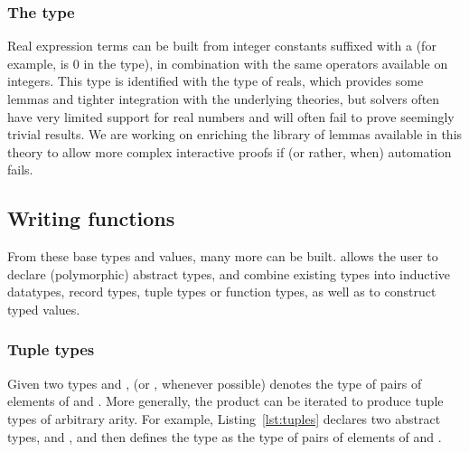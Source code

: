 \subsubsection*{The  type}
Real expression terms can be built from integer constants suffixed with a
 (for example,  is 0 in the  type), in
combination with the same operators available on integers. This type is
identified with the \WhyThree type of reals, which provides some lemmas and
tighter integration with the underlying theories, but \SMT solvers often have
very limited support for real numbers and will often fail to prove seemingly
trivial results. We are working on enriching the library of lemmas available
in this theory to allow more complex interactive proofs if (or rather, when)
automation fails.


\subsection{Writing functions}
From these base types and values, many more can be built. \EasyCrypt allows the
user to declare  (polymorphic) abstract types, and combine existing types into
inductive datatypes, record types, tuple types or function types, as well as to
construct typed values.

\subsubsection*{Tuple types}
Given two types  and ,
(or , whenever possible) denotes the type of pairs of elements of
 and . More generally, the product can be iterated to produce
tuple types of arbitrary arity. For example, Listing~\ref{lst:tuples} declares
two abstract types,  and , and then defines the type
 as the type of pairs of elements of  and .


